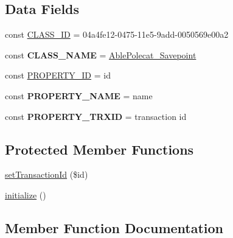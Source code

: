 \subsection*{Data Fields}
\begin{DoxyCompactItemize}
\item 
const \hyperlink{class_able_polecat___savepoint_ade806874ef80d8220f2d79c15884122d}{C\+L\+A\+S\+S\+\_\+\+I\+D} = \textquotesingle{}04a4fe12-\/0475-\/11e5-\/9add-\/0050569e00a2\textquotesingle{}
\item 
\hypertarget{class_able_polecat___savepoint_af796dca8d3ad5b3272b86a674fc90024}{}const {\bfseries C\+L\+A\+S\+S\+\_\+\+N\+A\+M\+E} = \textquotesingle{}\hyperlink{class_able_polecat___savepoint}{Able\+Polecat\+\_\+\+Savepoint}\textquotesingle{}\label{class_able_polecat___savepoint_af796dca8d3ad5b3272b86a674fc90024}

\item 
const \hyperlink{class_able_polecat___savepoint_a693979d85f1f89b2d1d1d6832d906efe}{P\+R\+O\+P\+E\+R\+T\+Y\+\_\+\+I\+D} = \textquotesingle{}id\textquotesingle{}
\item 
\hypertarget{class_able_polecat___savepoint_aab3d193493b30796383bfc740cdf4fea}{}const {\bfseries P\+R\+O\+P\+E\+R\+T\+Y\+\_\+\+N\+A\+M\+E} = \textquotesingle{}name\textquotesingle{}\label{class_able_polecat___savepoint_aab3d193493b30796383bfc740cdf4fea}

\item 
\hypertarget{class_able_polecat___savepoint_ae1770ba9fa04ca8466c8ddb3f9b57fe5}{}const {\bfseries P\+R\+O\+P\+E\+R\+T\+Y\+\_\+\+T\+R\+X\+I\+D} = \textquotesingle{}transaction id\textquotesingle{}\label{class_able_polecat___savepoint_ae1770ba9fa04ca8466c8ddb3f9b57fe5}

\end{DoxyCompactItemize}
\subsection*{Protected Member Functions}
\begin{DoxyCompactItemize}
\item 
\hyperlink{class_able_polecat___savepoint_a9e2c7057a015ff443bdeb02e64e15749}{set\+Transaction\+Id} (\$id)
\item 
\hyperlink{class_able_polecat___savepoint_a91098fa7d1917ce4833f284bbef12627}{initialize} ()
\end{DoxyCompactItemize}


\subsection{Member Function Documentation}
\hypertarget{class_able_polecat___savepoint_a239b1c70258014a86569483c2d009de6}{}
